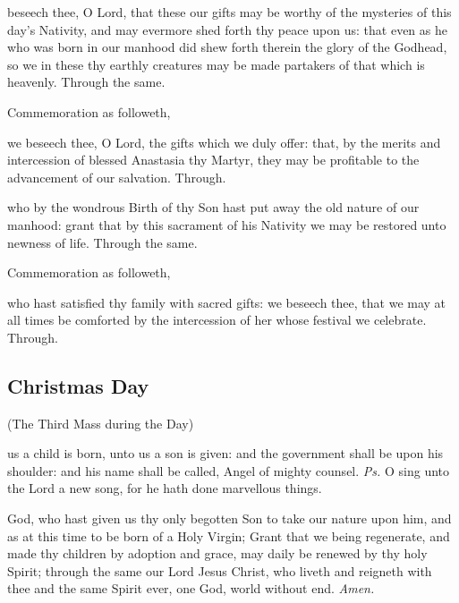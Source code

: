\secret
{} beseech thee, O Lord, that these our gifts may be worthy of the mysteries of this day's Nativity, and may evermore shed forth thy peace upon us: that even as he who was born in our manhood did shew forth therein the glory of the Godhead, so we in these thy earthly creatures may be made partakers of that which is heavenly. Through the same.
\begin{rubric}
	Commemoration  as followeth,
\end{rubric}
 we beseech thee, O Lord, the gifts which we duly offer: that, by the merits and intercession of blessed Anastasia thy Martyr, they may be profitable to the advancement of our salvation. Through.


\postcommunion
{} who by the wondrous Birth of thy Son hast put away the old nature of our manhood: grant that by this sacrament of his Nativity we may be restored unto newness of life. Through the same.
\begin{rubric}
	Commemoration  as followeth,
\end{rubric}
 who hast satisfied thy family with sacred gifts: we beseech thee, that we may at all times be comforted by the intercession of her whose festival we celebrate. Through.


\clearpage
\subsection{Christmas Day}\label{NativityMassIII}

\begin{inhead}
	(The Third Mass during the Day)
\end{inhead}

\introit
{} us a child is born, unto us a son is given: and the government shall be upon his shoulder: and his name shall be called, Angel of mighty counsel. \textit{Ps.} O sing unto the Lord a new song, for he hath done marvellous things.

\collect\label{NativityMassIIICollect}
 God, who hast given us thy only begotten Son to take our nature upon him, and as at this time to be born of a Holy Virgin; Grant that we being regenerate, and made thy children by adoption and grace, may daily be renewed by thy holy Spirit; through the same our Lord Jesus Christ, who liveth and reigneth with thee and the same Spirit ever, one God, world without end. \textit{Amen.}

